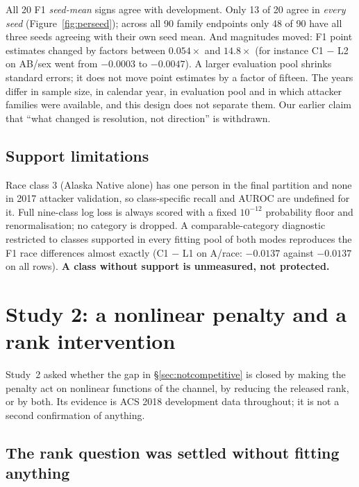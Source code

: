 \documentclass[10pt]{article}
\begin{document}
All 20 F1 \emph{seed-mean} signs agree with development. Only 13 of 20 agree in \emph{every seed}
(Figure~\ref{fig:perseed}); across all 90 family endpoints only 48 of 90 have all three seeds
agreeing with their own seed mean. And magnitudes moved: F1 point estimates changed by factors
between $0.054\times$ and $14.8\times$ (for instance C1 $-$ L2 on AB/sex went from $-0.0003$ to
$-0.0047$). A larger evaluation pool shrinks standard errors; it does not move point estimates by a
factor of fifteen. The years differ in sample size, in calendar year, in evaluation pool and in
which attacker families were available, and this design does not separate them. Our earlier claim
that ``what changed is resolution, not direction'' is withdrawn.

\subsection{Support limitations}

Race class 3 (Alaska Native alone) has one person in the final partition and none in 2017 attacker
validation, so class-specific recall and AUROC are undefined for it. Full nine-class log loss is
always scored with a fixed $10^{-12}$ probability floor and renormalisation; no category is dropped.
A comparable-category diagnostic restricted to classes supported in every fitting pool of both modes
reproduces the F1 race differences almost exactly (C1 $-$ L1 on A/race: $-0.0137$ against $-0.0137$
on all rows). \textbf{A class without support is unmeasured, not protected.}

\section{Study 2: a nonlinear penalty and a rank intervention}
\label{sec:results2}

Study~2 asked whether the gap in \S\ref{sec:notcompetitive} is closed by making the penalty act on
nonlinear functions of the channel, by reducing the released rank, or by both. Its evidence is ACS
2018 development data throughout; it is not a second confirmation of anything.

\subsection{The rank question was settled without fitting anything}

\begin{table}[t]
\centering\small

\caption{Outcome-free rank diagnostic, computed from already-saved 2018 arm spectra before any new
fit. $r_+=\min(16,\#\{\lambda_i(U-P)>\tau\})$ under the existing relative tolerance convention. No
ACS outcome, reserved label, attack or fit is involved.}
\label{tab:rank}
\end{table}
\end{document}
